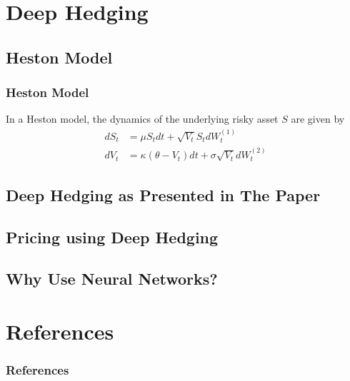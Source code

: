 \documentclass[serif]{beamer}
\begin{document}
\section{Deep Hedging}

\subsection{Heston Model}

\begin{frame}
    \frametitle{Heston Model}
    In a Heston model, the dynamics of the underlying risky asset $S$ are given
    by
    \begin{align*}
        dS_t & = \mu S_t dt + \sqrt{V_t} S_t dW_t^{(1)}                  \\
        dV_t & = \kappa (\theta - V_t) dt + \sigma \sqrt{V_t} dW_t^{(2)}
    \end{align*}
\end{frame}

\subsection{Deep Hedging as Presented in The Paper}
\subsection{Pricing using Deep Hedging}
\subsection{Why Use Neural Networks?}

\section{References}
\begin{frame}
    \frametitle{References}
    
    
\end{frame}
\end{document}

